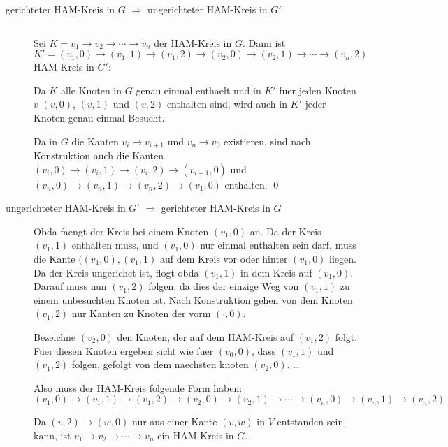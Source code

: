 \begin{description}
\item[gerichteter HAM-Kreis in $G$ $\Rightarrow$ ungerichteter HAM-Kreis in $G'$] $ $

Sei $K = v_1 \to v_2 \to \cdots \to v_n$ der HAM-Kreis in $G$.
Dann ist $K' = (v_1,0) \to (v_1,1) \to (v_1,2) \to (v_2, 0) \to (v_2, 1) \to \cdots \to (v_n,2)$
HAM-Kreis in $G'$:

Da $K$ alle Knoten in $G$ genau einmal enthaelt und in $K'$ fuer jeden Knoten $v$ $(v,0)$, $(v,1)$ und $(v,2)$ enthalten sind,
wird auch in $K'$ jeder Knoten genau einmal Besucht.

Da in $G$ die Kanten $v_i \to v_{i+1}$ und $v_n \to v_0$ existieren,
   sind nach Konstruktion auch die Kanten $(v_i,0) \to (v_i,1) \to (v_i,2) \to (v_{i+1},0)$ und
   $(v_n,0) \to (v_n,1) \to (v_n,2) \to (v_1,0)$ enthalten.
   \qed


\item[ungerichteter HAM-Kreis in $G'$ $\Rightarrow$ gerichteter HAM-Kreis in $G$]

Obda faengt der Kreis bei einem Knoten $(v_1,0)$ an. Da der Kreis $(v_1,1)$ enthalten muss,
und $(v_1,0)$ nur einmal enthalten sein darf, muss die Kante $((v_1,0),(v_1,1)$ auf dem Kreis
vor oder hinter $(v_1,0)$ liegen. Da der Kreis ungerichet ist, flogt obda $(v_1,1)$ in dem Kreis auf $(v_1,0)$.
Darauf muss nun $(v_1,2)$ folgen, da dies der einzige Weg von $(v_1,1)$ zu einem unbesuchten Knoten ist.
Nach Konstruktion gehen von dem Knoten $(v_1,2)$ nur Kanten zu Knoten der vorm $(\cdot,0)$. 

Bezeichne $(v_2,0)$ den Knoten, der auf dem HAM-Kreis auf $(v_1,2)$ folgt. Fuer diesen Knoten
ergeben sicht wie fuer $(v_0,0)$, dass $(v_1,1)$ und $(v_1,2)$ folgen, gefolgt von dem naechsten 
knoten $(v_2,0)$. \ldots

Also muss der HAM-Kreis folgende Form haben: 
$(v_1,0) \to (v_1,1) \to (v_1,2) \to (v_2,0) \to (v_2,1) \to \cdots \to (v_n,0) \to (v_n,1) \to (v_n,2)$

Da $(v,2) \to (w,0)$ nur aus einer Kante $(v,w)$ in $V$ entstanden sein kann,
ist $v_1 \to v_2 \to \cdots \to v_n$ ein HAM-Kreis in $G$.

\end{description}


